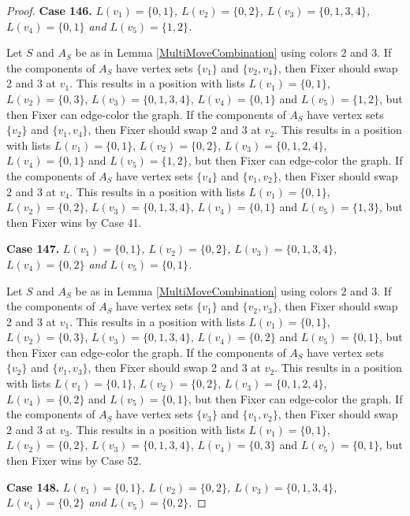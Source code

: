 \documentclass[12pt]{amsart}
\theoremstyle{plain}
\theoremstyle{definition}
\theoremstyle{remark}
\begin{document}
\begin{proof}
\noindent\textbf{Case 146.  }\textit{$L(v_1) = \{0, 1\}$, $L(v_2) = \{0, 2\}$, $L(v_3) = \{0, 1, 3, 4\}$, $L(v_4) = \{0, 1\}$ and $L(v_5) = \{1, 2\}$.}

Let $S$ and $A_S$ be as in Lemma \ref{MultiMoveCombination} using colors $2$ and $3$. If the components of $A_S$ have vertex sets $\{v_1\}$ and $\{v_2, v_4\}$, then Fixer should swap 2 and 3 at $v_1$. This results in a position with lists $L(v_1) = \{0, 1\}$, $L(v_2) = \{0, 3\}$, $L(v_3) = \{0, 1, 3, 4\}$, $L(v_4) = \{0, 1\}$ and $L(v_5) = \{1, 2\}$, but then Fixer can edge-color the graph. If the components of $A_S$ have vertex sets $\{v_2\}$ and $\{v_1, v_4\}$, then Fixer should swap 2 and 3 at $v_2$. This results in a position with lists $L(v_1) = \{0, 1\}$, $L(v_2) = \{0, 2\}$, $L(v_3) = \{0, 1, 2, 4\}$, $L(v_4) = \{0, 1\}$ and $L(v_5) = \{1, 2\}$, but then Fixer can edge-color the graph. If the components of $A_S$ have vertex sets $\{v_4\}$ and $\{v_1, v_2\}$, then Fixer should swap 2 and 3 at $v_4$. This results in a position with lists $L(v_1) = \{0, 1\}$, $L(v_2) = \{0, 2\}$, $L(v_3) = \{0, 1, 3, 4\}$, $L(v_4) = \{0, 1\}$ and $L(v_5) = \{1, 3\}$, but then Fixer wins by Case 41. 

\noindent\textbf{Case 147.  }\textit{$L(v_1) = \{0, 1\}$, $L(v_2) = \{0, 2\}$, $L(v_3) = \{0, 1, 3, 4\}$, $L(v_4) = \{0, 2\}$ and $L(v_5) = \{0, 1\}$.}

Let $S$ and $A_S$ be as in Lemma \ref{MultiMoveCombination} using colors $2$ and $3$. If the components of $A_S$ have vertex sets $\{v_1\}$ and $\{v_2, v_3\}$, then Fixer should swap 2 and 3 at $v_1$. This results in a position with lists $L(v_1) = \{0, 1\}$, $L(v_2) = \{0, 3\}$, $L(v_3) = \{0, 1, 3, 4\}$, $L(v_4) = \{0, 2\}$ and $L(v_5) = \{0, 1\}$, but then Fixer can edge-color the graph. If the components of $A_S$ have vertex sets $\{v_2\}$ and $\{v_1, v_3\}$, then Fixer should swap 2 and 3 at $v_2$. This results in a position with lists $L(v_1) = \{0, 1\}$, $L(v_2) = \{0, 2\}$, $L(v_3) = \{0, 1, 2, 4\}$, $L(v_4) = \{0, 2\}$ and $L(v_5) = \{0, 1\}$, but then Fixer can edge-color the graph. If the components of $A_S$ have vertex sets $\{v_3\}$ and $\{v_1, v_2\}$, then Fixer should swap 2 and 3 at $v_3$. This results in a position with lists $L(v_1) = \{0, 1\}$, $L(v_2) = \{0, 2\}$, $L(v_3) = \{0, 1, 3, 4\}$, $L(v_4) = \{0, 3\}$ and $L(v_5) = \{0, 1\}$, but then Fixer wins by Case 52. 

\noindent\textbf{Case 148.  }\textit{$L(v_1) = \{0, 1\}$, $L(v_2) = \{0, 2\}$, $L(v_3) = \{0, 1, 3, 4\}$, $L(v_4) = \{0, 2\}$ and $L(v_5) = \{0, 2\}$.}


\end{proof}
\end{document}
